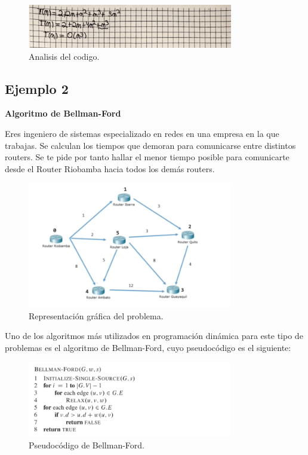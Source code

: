 \begin{figure}[H]
	\centering
	\includegraphics[width=0.8\textwidth]{complejidad_distancia_ejem1_3.png}
	\caption{Analisis del codigo.}
	\label{fig:complejidad1}
\end{figure}


\subsection{Ejemplo 2}
\textbf{Algoritmo de Bellman-Ford}

Eres ingeniero de sistemas especializado en redes en una empresa en la que trabajas. Se calculan los tiempos que demoran para comunicarse entre distintos routers. Se te pide por tanto hallar el menor tiempo posible para comunicarte desde el Router Riobamba hacia todos los demás routers. 

\begin{figure}[H]
	\centering
	\includegraphics[width=0.8\textwidth]{bellman-fordejemplo.png}
	\caption{Representación gráfica del problema.}
	\label{fig:resultado}
\end{figure}


Uno de los algoritmos más utilizados en programación dinámica para este tipo de problemas es el algoritmo de Bellman-Ford, cuyo pseudocódigo es el siguiente:

\begin{figure}[H]
	\centering
	\includegraphics[width=0.8\textwidth]{distancias_cortas_Pseudo2.png}
	\caption{Pseudocódigo de Bellman-Ford.}
	\label{fig:resultado}
\end{figure}

